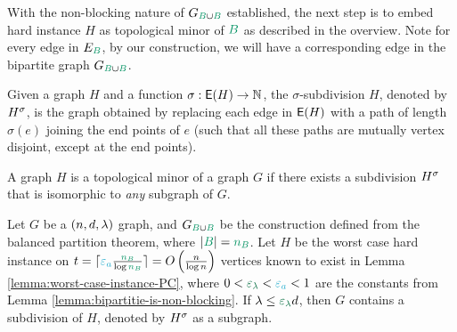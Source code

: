 \documentclass[11pt]{article}
\begin{document}
With the non-blocking nature of $\BipartiteG$ established, the next step is to embed hard instance $H$ as topological minor of $\GreenB$ as described in the overview.
Note for every edge in $E_{\GreenB}$, by our construction, we will have a corresponding edge in the bipartite graph $\BipartiteG$.


\begin{definition}\label{def:subdivisions}
Given a graph $H$ and a function $\sigma: \mathsf{E}(H) \rightarrow \mathbb{N}$, the $\sigma$-subdivision $H$, denoted by ${H}^{\sigma}$, is the graph obtained by replacing each edge in $\mathsf{E}(H)$ with a path of length $\sigma(e)$ joining the end points of $e$ (such that all these paths are mutually vertex disjoint, except at the end points).	
\end{definition}

\begin{definition}\label{def:topological-minor}
A graph $H$ is a topological minor of a graph $G$ if there exists a subdivision ${H}^{\sigma}$ that is isomorphic to \emph{any} subgraph of $G$.	
\end{definition}

\begin{theorem}\label{thm:top-embedding}
Let $G$ be a $(n, d, \lambda)$ graph, and $\BipartiteG$ be the construction defined from the balanced partition theorem, where $|\GreenB| = \na$.
Let $H$ be the worst case hard instance on $t = \lceil\epsilonA \frac{\na}{\log \na}\rceil = \BigO{\frac{n}{\log n}}$ vertices known to exist in Lemma \ref{lemma:worst-case-instance-PC}, where $0 < \epsilonL < \epsilonA <1$ are the constants from  Lemma \ref{lemma:bipartitie-is-non-blocking}.	
If $\lambda \leq \epsilonL d$, then $G$ contains a subdivision of $H$, denoted by ${H}^{\sigma}$ as a subgraph.

\end{theorem}
\end{document}
